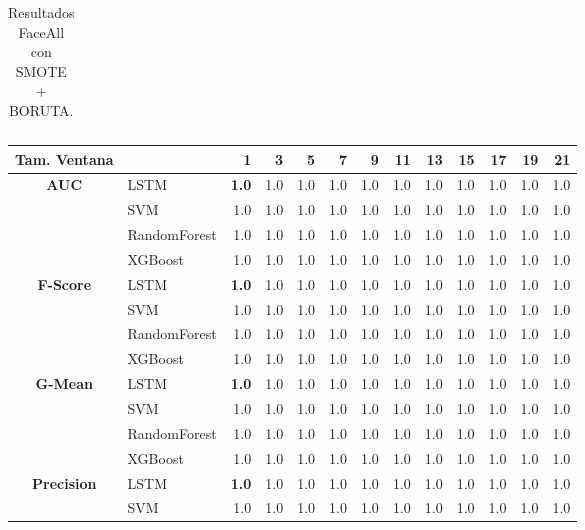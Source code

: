 \begin{table}[h]
\begin{adjustbox}{max width=11cm}
\begin{tabular}{|c|l|r|r|r|r|r|r|r|r|r|r|r|}
\end{tabular}
\end{adjustbox}
\caption{Resultados FaceAll con SMOTE + BORUTA.}
\label{tab:faceAllSMOTEBORUTA}
\end{table}
\newpage

\begin{table}[h]
\centering
\begin{adjustbox}{max width=11cm}
\begin{tabular}{|c|l|r|r|r|r|r|r|r|r|r|r|r|}
			\hline
			\textbf{Tam. Ventana}&         &   1  &   3  &   5  &   7  &   9  &   11 &   13 &   15 &   17 &   19 &   21 \\
			\hline
			\textbf{AUC} & LSTM &  \textbf{1.0} &  1.0 &  1.0 &  1.0 &  1.0 &  1.0 &  1.0 &  1.0 &  1.0 &  1.0 &  1.0 \\
			& SVM &  1.0 &  1.0 &  1.0 &  1.0 &  1.0 &  1.0 &  1.0 &  1.0 &  1.0 &  1.0 &  1.0 \\
			& RandomForest &  1.0 &  1.0 &  1.0 &  1.0 &  1.0 &  1.0 &  1.0 &  1.0 &  1.0 &  1.0 &  1.0 \\
			& XGBoost &  1.0 &  1.0 &  1.0 &  1.0 &  1.0 &  1.0 &  1.0 &  1.0 &  1.0 &  1.0 &  1.0 \\
			\hline
			\textbf{F-Score} & LSTM &  \textbf{1.0} &  1.0 &  1.0 &  1.0 &  1.0 &  1.0 &  1.0 &  1.0 &  1.0 &  1.0 &  1.0 \\
			& SVM &  1.0 &  1.0 &  1.0 &  1.0 &  1.0 &  1.0 &  1.0 &  1.0 &  1.0 &  1.0 &  1.0 \\
			& RandomForest &  1.0 &  1.0 &  1.0 &  1.0 &  1.0 &  1.0 &  1.0 &  1.0 &  1.0 &  1.0 &  1.0 \\
			& XGBoost &  1.0 &  1.0 &  1.0 &  1.0 &  1.0 &  1.0 &  1.0 &  1.0 &  1.0 &  1.0 &  1.0 \\
			\hline
			\textbf{G-Mean} & LSTM &  \textbf{1.0} &  1.0 &  1.0 &  1.0 &  1.0 &  1.0 &  1.0 &  1.0 &  1.0 &  1.0 &  1.0 \\
			& SVM &  1.0 &  1.0 &  1.0 &  1.0 &  1.0 &  1.0 &  1.0 &  1.0 &  1.0 &  1.0 &  1.0 \\
			& RandomForest &  1.0 &  1.0 &  1.0 &  1.0 &  1.0 &  1.0 &  1.0 &  1.0 &  1.0 &  1.0 &  1.0 \\
			& XGBoost &  1.0 &  1.0 &  1.0 &  1.0 &  1.0 &  1.0 &  1.0 &  1.0 &  1.0 &  1.0 &  1.0 \\
			\hline
			\textbf{Precision} & LSTM &  \textbf{1.0} &  1.0 &  1.0 &  1.0 &  1.0 &  1.0 &  1.0 &  1.0 &  1.0 &  1.0 &  1.0 \\
			& SVM &  1.0 &  1.0 &  1.0 &  1.0 &  1.0 &  1.0 &  1.0 &  1.0 &  1.0 &  1.0 &  1.0 \\

\end{tabular}
\end{adjustbox}
\end{table}
